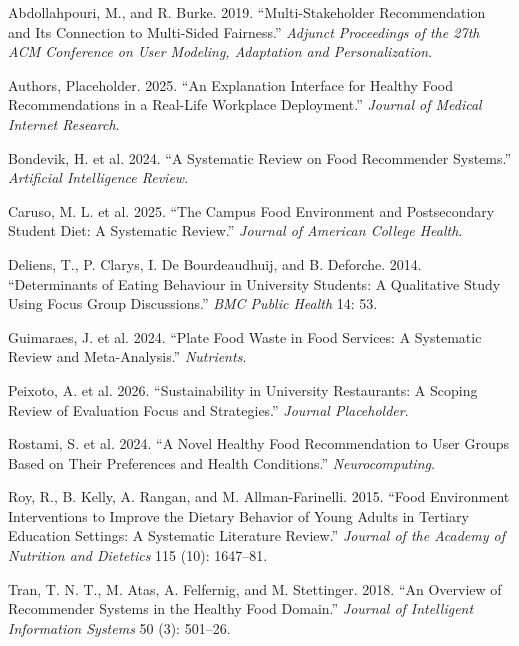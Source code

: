 \documentclass[
  letterpaper,
  DIV=11,
  numbers=noendperiod]{scrartcl}
\newlength{\cslhangindent}
\newenvironment{CSLReferences}[2] %
 {\begin{list}{}{%
  \setlength{\itemindent}{0pt}
  \setlength{\leftmargin}{0pt}
  \setlength{\parsep}{0pt}
  \ifodd #1
   \setlength{\leftmargin}{\cslhangindent}
   \setlength{\itemindent}{-1\cslhangindent}
  \fi
  \setlength{\itemsep}{#2\baselineskip}}}
 {\end{list}}
\begin{document}
\protect{}\label{refs}
\begin{CSLReferences}{1}{1}
Abdollahpouri, M., and R. Burke. 2019. {``Multi-Stakeholder
Recommendation and Its Connection to Multi-Sided Fairness.''}
\emph{Adjunct Proceedings of the 27th ACM Conference on User Modeling,
Adaptation and Personalization}.

Authors, Placeholder. 2025. {``An Explanation Interface for Healthy Food
Recommendations in a Real-Life Workplace Deployment.''} \emph{Journal of
Medical Internet Research}.

{Bondevik, H. et al.} 2024. {``A Systematic Review on Food Recommender
Systems.''} \emph{Artificial Intelligence Review}.

{Caruso, M. L. et al.} 2025. {``The Campus Food Environment and
Postsecondary Student Diet: A Systematic Review.''} \emph{Journal of
American College Health}.

Deliens, T., P. Clarys, I. De Bourdeaudhuij, and B. Deforche. 2014.
{``Determinants of Eating Behaviour in University Students: A
Qualitative Study Using Focus Group Discussions.''} \emph{BMC Public
Health} 14: 53.

{Guimaraes, J. et al.} 2024. {``Plate Food Waste in Food Services: A
Systematic Review and Meta-Analysis.''} \emph{Nutrients}.

{Peixoto, A. et al.} 2026. {``Sustainability in University Restaurants:
A Scoping Review of Evaluation Focus and Strategies.''} \emph{Journal
Placeholder}.

{Rostami, S. et al.} 2024. {``A Novel Healthy Food Recommendation to
User Groups Based on Their Preferences and Health Conditions.''}
\emph{Neurocomputing}.

Roy, R., B. Kelly, A. Rangan, and M. Allman-Farinelli. 2015. {``Food
Environment Interventions to Improve the Dietary Behavior of Young
Adults in Tertiary Education Settings: A Systematic Literature
Review.''} \emph{Journal of the Academy of Nutrition and Dietetics} 115
(10): 1647--81.

Tran, T. N. T., M. Atas, A. Felfernig, and M. Stettinger. 2018. {``An
Overview of Recommender Systems in the Healthy Food Domain.''}
\emph{Journal of Intelligent Information Systems} 50 (3): 501--26.


\end{CSLReferences}
\end{document}
